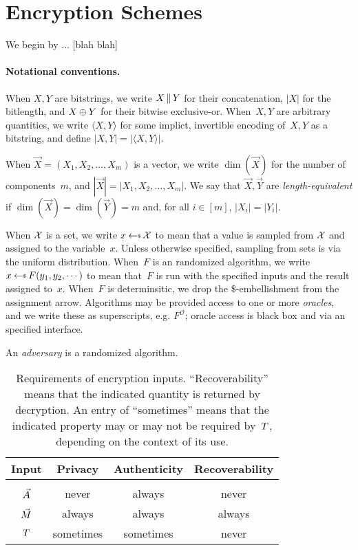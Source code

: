 \newcommand{\dimension}[1]{\dim( #1 )}
\section{Encryption Schemes}
\label{sec:prelims}
\label{sec:encryption}
We begin by ... [blah blah]

\paragraph{Notational conventions. }When $X,Y$ are bitstrings, we write $X \,\|\, Y$ for their concatenation, $|X|$ for the bitlength, and $X\oplus Y$ for their bitwise exclusive-or.  When~$X,Y$ are arbitrary quantities, we write $\langle X,Y \rangle$ for some implict, invertible encoding of~$X,Y$ as a bitstring, and define $|X,Y|=|\langle X,Y\rangle|$.

When $\vec{X}=(X_1,X_2,\ldots,X_m)$ is a  vector, we write $\dimension{\vec{X}}$ for the number of components~$m$, and $|\vec{X}|=|X_1,X_2,\ldots,X_m|$.  We say that $\vec{X},\vec{Y}$ are \emph{length-equivalent} if $\dimension{\vec{X}}=\dimension{\vec{Y}}=m$ and, for all $i\in[m]$, $|X_i|=|Y_i|$.

When $\mathcal{X}$ is a set, we write $x \getsr \calX$ to mean that a value is sampled from $\mathcal{X}$ and assigned to the variable~$x$.  Unless otherwise specified, sampling from sets is via the uniform distribution.  
When~$F$ is an randomized algorithm, we write $x \getsr F(y_1,y_2,\cdots)$ to mean that~$F$ is run with the specified inputs and the result assigned to~$x$.  When~$F$ is determinsitic, we drop the $\$$-embellishment from the assignment arrow.  Algorithms may be provided access to one or more \emph{oracles}, and we write these as superscripts, e.g. $F^{\mathcal{O}}$; oracle access is black box and via an specified interface.  

An \emph{adversary} is a randomized algorithm.


\begin{table}[tp]
\centering
\begin{tabular}{c||c|c|c}
Input  & Privacy & Authenticity & Recoverability \\
\hline
&&&\\[-1.5ex]
$\vec{A}$      & never    & always     &  never \\
$\vec{M}$   & always  & always    & always \\ 
$T$    & sometimes    & sometimes  &  never \\ [0.5ex]
\hline
\end{tabular}
\caption{Requirements of encryption inputs. ``Recoverability'' means that the indicated quantity is returned by decryption.  An entry of ``sometimes'' means that the indicated property may or may not be required by~$T$, depending on the context of its use.}
\end{table}

